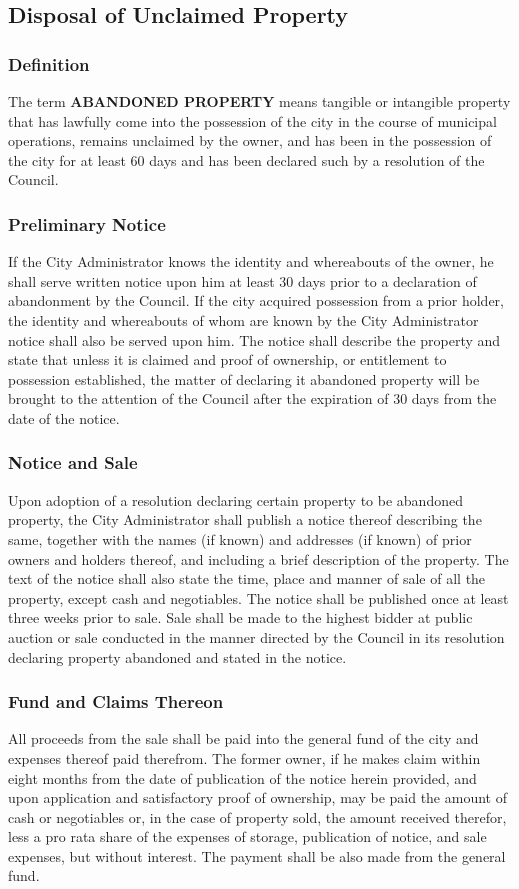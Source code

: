 \subsection{Disposal of Unclaimed Property}
\subsubsection{Definition}
The term \textbf{ABANDONED PROPERTY} means tangible or intangible property that has lawfully come into the possession of the city in the course of municipal operations, remains unclaimed by the owner, and has been in the possession of the city for at least 60 days and has been declared such by a resolution of the Council.
\subsubsection{Preliminary Notice}
If the City Administrator knows the identity and whereabouts of the owner, he shall serve written notice upon him at least 30 days prior to a declaration of abandonment by the Council.  If the city acquired possession from a prior holder, the identity and whereabouts of whom are known by the City Administrator notice shall also be served upon him. The notice shall describe the property and state that unless it is claimed and proof of ownership, or entitlement to possession established, the matter of declaring it abandoned property will be brought to the attention of the Council after the expiration of 30 days from the date of the notice.
\subsubsection{Notice and Sale}
Upon adoption of a resolution declaring certain property to be abandoned property, the City Administrator shall publish a notice thereof describing the same, together with the names (if known) and addresses (if known) of prior owners and holders thereof, and including a brief description of the property. The text of the notice shall also state the time, place and manner of sale of all the property, except cash and negotiables. The notice shall be published once at least three weeks prior to sale. Sale shall be made to the highest bidder at public auction or sale conducted in the manner directed by the Council in its resolution declaring property abandoned and stated in the notice.
\subsubsection{Fund and Claims Thereon}
All proceeds from the sale shall be paid into the general fund of the city and expenses thereof paid therefrom. The former owner, if he makes claim within eight months from the date of publication of the notice herein provided, and upon application and satisfactory proof of ownership, may be paid the amount of cash or negotiables or, in the case of property sold, the amount received therefor, less a pro rata share of the expenses of storage, publication of notice, and sale expenses, but without interest.  The payment shall be also made from the general fund.
